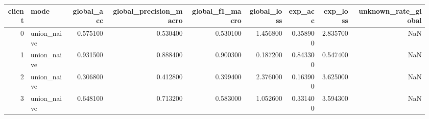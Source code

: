 \begin{tabular}{rlrrrrrrr}
\toprule
client & mode & global_acc & global_precision_macro & global_f1_macro & global_loss & exp_acc & exp_loss & unknown_rate_global \\
\midrule
0 & union_naive & 0.575100 & 0.530400 & 0.530100 & 1.456800 & 0.358900 & 2.835700 & NaN \\
1 & union_naive & 0.931500 & 0.888400 & 0.900300 & 0.187200 & 0.843300 & 0.547400 & NaN \\
2 & union_naive & 0.306800 & 0.412800 & 0.399400 & 2.376000 & 0.163900 & 3.625000 & NaN \\
3 & union_naive & 0.648100 & 0.713200 & 0.583000 & 1.052600 & 0.331400 & 3.594300 & NaN \\
\bottomrule
\end{tabular}
